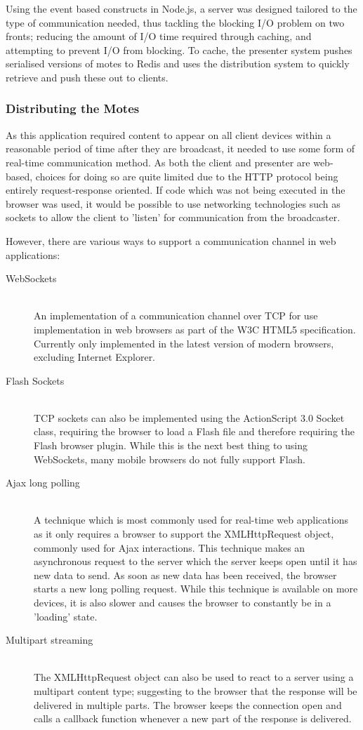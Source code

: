 \documentclass[a4papert,11pt,notitlepage]{ltxdoc}
\begin{document}
Using the event based constructs in Node.js, a server was designed tailored to the type of communication needed, thus tackling the blocking I/O problem on two fronts; reducing the amount of I/O time required through caching, and attempting to prevent I/O from blocking. To cache, the presenter system pushes serialised versions of motes to Redis and uses the distribution system to quickly retrieve and push these out to clients.

\subsubsection{Distributing the Motes}
As this application required content to appear on all client devices within a reasonable period of time after they are broadcast, it needed to use some form of real-time communication method. As both the client and presenter are web-based, choices for doing so are quite limited due to the HTTP protocol being entirely request-response oriented. If code which was not being executed in the browser was used, it would be possible to use networking technologies such as sockets to allow the client to 'listen' for communication from the broadcaster.

However, there are various ways to support a  communication channel in web applications:
\begin{description}
\item[WebSockets] \hfill \\
An implementation of a communication channel over TCP for use implementation in web browsers as part of the W3C HTML5 specification. Currently only implemented in the latest version of modern browsers, excluding Internet Explorer.
\item[Flash Sockets] \hfill \\
TCP sockets can also be implemented using the ActionScript 3.0 Socket class, requiring the browser to load a Flash file and therefore requiring the Flash browser plugin. While this is the next best thing to using WebSockets, many mobile browsers do not fully support Flash.
\item[Ajax long polling] \hfill \\
A technique which is most commonly used for real-time web applications as it only requires a browser to support the XMLHttpRequest object, commonly used for Ajax interactions. This technique makes an asynchronous request to the server which the server keeps open until it has new data to send. As soon as new data has been received, the browser starts a new long polling request. While this technique is available on more devices, it is also slower and causes the browser to constantly be in a 'loading' state.
\item[Multipart streaming] \hfill \\
The XMLHttpRequest object can also be used to react to a server using a multipart content type; suggesting to the browser that the response will be delivered in multiple parts. The browser keeps the connection open and calls a callback function whenever a new part of the response is delivered.
\end{description}
\end{document}
